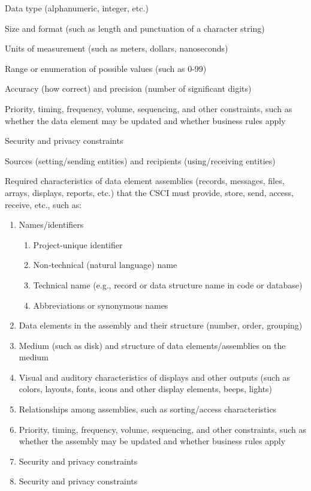 \documentclass{fidata-report-template}
\begin{document}
Data type (alphanumeric, integer, etc.)

Size and format (such as length and punctuation of a character string)

Units of measurement (such as meters, dollars, nanoseconds)

Range or enumeration of possible values (such as 0-99)

Accuracy (how correct) and precision (number of significant digits)

Priority, timing, frequency, volume, sequencing, and other constraints,
such as whether the data element may be updated and whether business
rules apply

Security and privacy constraints

Sources (setting/sending entities) and recipients (using/receiving
entities)

Required characteristics of data element assemblies (records, messages,
files, arrays, displays, reports, etc.) that the CSCI must provide,
store, send, access, receive, etc., such as:

\begin{enumerate}
\itemsep1pt\parskip0pt
\item
  Names/identifiers

  \begin{enumerate}
  \itemsep1pt\parskip0pt
  \item
    Project-unique identifier
  \item
    Non-technical (natural language) name
  \item
    Technical name (e.g., record or data structure name in code or
    database)
  \item
    Abbreviations or synonymous names
  \end{enumerate}
\item
  Data elements in the assembly and their structure (number, order,
  grouping)
\item
  Medium (such as disk) and structure of data elements/assemblies on the
  medium
\item
  Visual and auditory characteristics of displays and other outputs
  (such as colors, layouts, fonts, icons and other display elements,
  beeps, lights)
\item
  Relationships among assemblies, such as sorting/access characteristics
\item
  Priority, timing, frequency, volume, sequencing, and other
  constraints, such as whether the assembly may be updated and whether
  business rules apply
\item
  Security and privacy constraints
\item
  Security and privacy constraints
\end{enumerate}
\end{document}

